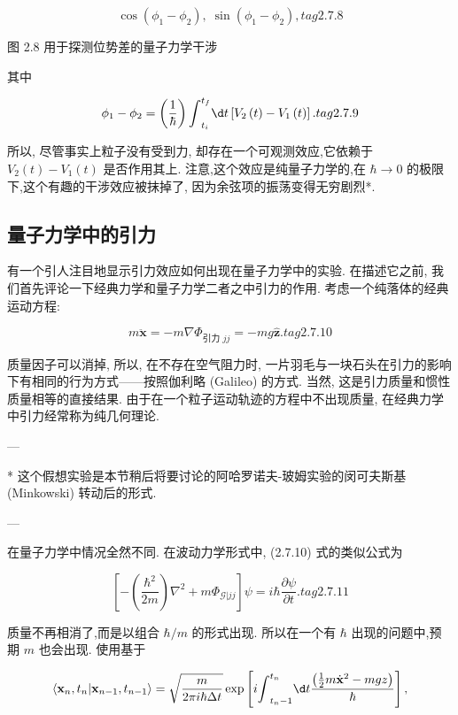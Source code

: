 \documentclass[lang=cn,newtx,10pt,scheme=chinese,thmcnt=section]{elegantbook}
\begin{document}
$$
\cos \left( {{\phi }_{1} - {\phi }_{2}}\right) ,\;\sin \left( {{\phi }_{1} - {\phi }_{2}}\right) , tag{2.7.8}
$$



图 2.8 用于探测位势差的量子力学干涉

其中

$$
{\phi }_{1} - {\phi }_{2} = \left( \frac{1}{\hbar }\right) {\int }_{{t}_{i}}^{{t}_{f}}{\d t}\left\lbrack {{V}_{2}\left( t\right) - {V}_{1}\left( t\right) }\right\rbrack . tag{2. 7.9}
$$

所以, 尽管事实上粒子没有受到力, 却存在一个可观测效应,它依赖于 ${V}_{2}\left( t\right) - {V}_{1}\left( t\right)$ 是否作用其上. 注意,这个效应是纯量子力学的,在 $\hbar \rightarrow 0$ 的极限下,这个有趣的干涉效应被抹掉了, 因为余弦项的振荡变得无穷剧烈*.

\subsection*{量子力学中的引力}
有一个引人注目地显示引力效应如何出现在量子力学中的实验. 在描述它之前, 我们首先评论一下经典力学和量子力学二者之中引力的作用. 考虑一个纯落体的经典运动方程:

$$
m\ddot{\mathbf{x}} = - m\nabla {\Phi }_{\text{引力 }{jj}} = - {mg}\widehat{\mathbf{z}}. tag{2. 7.10}
$$

质量因子可以消掉, 所以, 在不存在空气阻力时, 一片羽毛与一块石头在引力的影响下有相同的行为方式——按照伽利略 (Galileo) 的方式. 当然, 这是引力质量和惯性质量相等的直接结果. 由于在一个粒子运动轨迹的方程中不出现质量, 在经典力学中引力经常称为纯几何理论.

---

* 这个假想实验是本节稍后将要讨论的阿哈罗诺夫-玻姆实验的闵可夫斯基 (Minkowski) 转动后的形式.

---

在量子力学中情况全然不同. 在波动力学形式中, (2.7.10) 式的类似公式为

$$
\left\lbrack {-\left( \frac{{\hbar }^{2}}{2m}\right) {\nabla }^{2} + m{\Phi }_{\mathcal{G} | {jj}}}\right\rbrack \psi = i\hbar \frac{\partial \psi }{\partial t}. tag{2.7.11}
$$

质量不再相消了,而是以组合 $\hbar /m$ 的形式出现. 所以在一个有 $\hbar$ 出现的问题中,预期 $m$ 也会出现. 使用基于

$$
\left\langle {{\mathbf{x}}_{n},{t}_{n} | {\mathbf{x}}_{n - 1},{t}_{n - 1}}\right\rangle = \sqrt{\frac{m}{{2\pi i}\hbar {\Delta t}}}\exp \left\lbrack {i{\int }_{{t}_{n} - 1}^{{t}_{n}}{\d t}\frac{\left( \frac{1}{2}m{\dot{\mathbf{x}}}^{2} - mgz\right) }{\hbar }}\right\rbrack ,
$$
\end{document}
